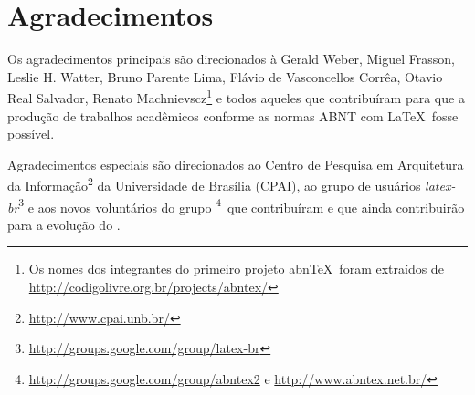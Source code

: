 \documentclass[../monografia.tex]{subfiles}
\begin{document}
    
    {\centering    
        \chapter*{Agradecimentos}
    }
    
Os agradecimentos principais são direcionados à Gerald Weber, Miguel Frasson,
Leslie H. Watter, Bruno Parente Lima, Flávio de Vasconcellos Corrêa, Otavio Real
Salvador, Renato Machnievscz\footnote{Os nomes dos integrantes do primeiro
projeto abn\TeX\ foram extraídos de
\url{http://codigolivre.org.br/projects/abntex/}} e todos aqueles que
contribuíram para que a produção de trabalhos acadêmicos conforme
as normas ABNT com \LaTeX\ fosse possível.

Agradecimentos especiais são direcionados ao Centro de Pesquisa em Arquitetura
da Informação\footnote{\url{http://www.cpai.unb.br/}} da Universidade de
Brasília (CPAI), ao grupo de usuários
\emph{latex-br}\footnote{\url{http://groups.google.com/group/latex-br}} e aos
novos voluntários do grupo
\emph{\abnTeX}\footnote{\url{http://groups.google.com/group/abntex2} e
\url{http://www.abntex.net.br/}}~que contribuíram e que ainda
contribuirão para a evolução do \abnTeX.
\end{document}
